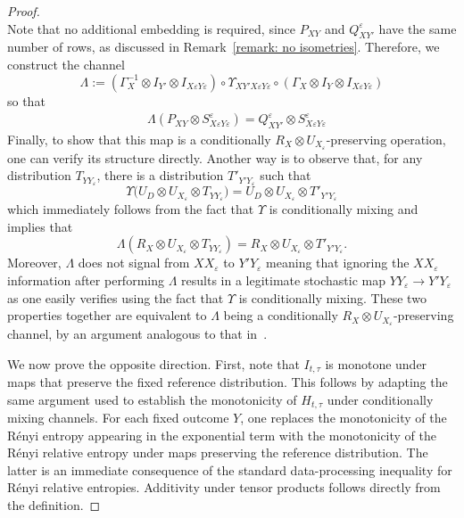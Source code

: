 \documentclass[aps,pra,11pt,onecolumn,nofootinbib,tightenlines]{revtex4-2}
\theoremstyle{definition}
\begin{document}
\begin{proof}
\begin{equation}
\end{equation}
Note that no additional embedding is required, since $P_{XY}$ and $Q^\varepsilon_{XY'}$ have the same number of rows, as discussed in Remark~\ref{remark: no isometries}.
Therefore, we construct the channel
\begin{equation}
	\Lambda := (\Gamma^{-1}_X \otimes I_{Y'}\otimes I_{X\varepsilon Y\varepsilon}) \circ \Upsilon_{XY'X\varepsilon Y\varepsilon} \circ (\Gamma_X \otimes I_{Y}\otimes I_{X\varepsilon Y\varepsilon})
\end{equation}
so that
\begin{align}
	&\Lambda (P_{XY} \otimes S^\varepsilon_{X\varepsilon Y\varepsilon})  = Q^\varepsilon_{XY'} \otimes S^\varepsilon_{X\varepsilon Y\varepsilon}%
\end{align}
Finally, to show that this map is a conditionally $R_X\otimes U_{X_\varepsilon}$-preserving operation, one can verify its structure directly. Another way is to observe that, for any distribution $T_{YY_\varepsilon}$, there is a distribution $T'_{Y'Y_\varepsilon}$ such that
\begin{equation}
\Upsilon\big(U_D\otimes U_{X_\varepsilon}\otimes T_{YY_\varepsilon}\big)=U_D\otimes U_{X_\varepsilon}\otimes T'_{Y'Y_\varepsilon}
\end{equation}
which immediately follows from the fact that $\Upsilon$ is conditionally mixing and implies that
\begin{equation}
\Lambda(R_{X}\otimes U_{X_\varepsilon}\otimes T_{YY_\varepsilon})=R_X\otimes U_{X_\varepsilon
}\otimes T'_{Y'Y_\varepsilon}.
\end{equation}
Moreover, $\Lambda$ does not signal from $XX_\varepsilon$ to $Y'Y_\varepsilon$ meaning that ignoring the $XX_\varepsilon$ information after performing $\Lambda$ results in a legitimate stochastic map $YY_\varepsilon\to Y'Y_\varepsilon$ as one easily verifies using the fact that $\Upsilon$ is conditionally mixing. These two properties together are equivalent to $\Lambda$ being a conditionally $R_X\otimes U_{X_\varepsilon}$-preserving channel, by an argument analogous to that in~\cite[Section C]{gour2024inevitability}.





We now prove the opposite direction. First, note that $I_{t,\tau}$ is monotone under maps that preserve the fixed reference distribution. This follows by adapting the same argument used to establish the monotonicity of $H_{t,\tau}$ under conditionally mixing channels. For each fixed outcome $Y$, one replaces the monotonicity of the Rényi entropy appearing in the exponential term with the monotonicity of the Rényi relative entropy under maps preserving the reference distribution. The latter is an immediate consequence of the standard data-processing inequality for R\'enyi relative entropies. Additivity under tensor products follows directly from the definition.


\end{proof}
\end{document}
